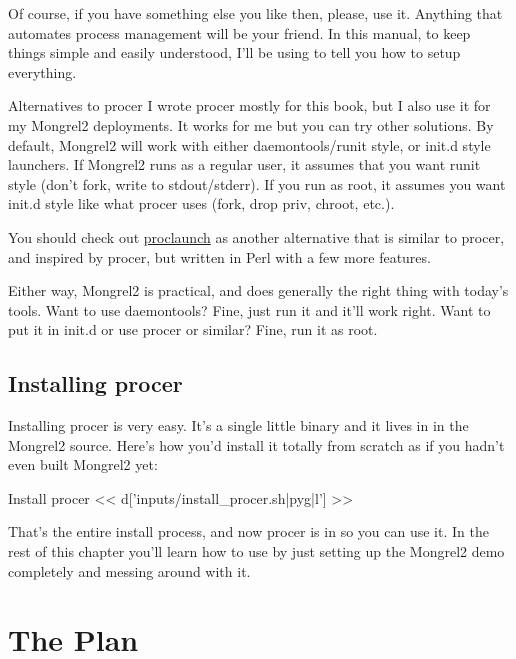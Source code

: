Of course, if you have something else you like then, please, use it.  Anything that automates
process management will be your friend.  In this manual, to keep things simple and easily
understood, I'll be using  to tell you how to setup everything.

\begin{aside}{Alternatives to procer}
I wrote procer mostly for this book, but I also use it for my Mongrel2 deployments.
It works for me but you can try other solutions.  By default, Mongrel2 will work with
either daemontools/runit style, or init.d style launchers.  If Mongrel2 runs as a
regular user, it assumes that you want runit style (don't fork, write to stdout/stderr).
If you run as root, it assumes you want init.d style like what procer uses (fork, drop priv, 
chroot, etc.).

You should check out \href{http://github.com/peterkeen/proclaunch}{proclaunch} as another
alternative that is similar to procer, and inspired by procer, but written in Perl with a
few more features.

Either way, Mongrel2 is practical, and does generally the right thing with today's tools.
Want to use daemontools?  Fine, just run it  and it'll
work right.  Want to put it in init.d or use procer or similar?  Fine, run it as root.
\end{aside}


\subsection{Installing procer}

Installing procer is very easy.  It's a single little binary and it lives in
 in the Mongrel2 source.  Here's how you'd install it
totally from scratch as if you hadn't even built Mongrel2 yet:

\begin{code}{Install procer}
<< d['inputs/install_procer.sh|pyg|l'] >>
\end{code}

That's the entire install process, and now procer is in 
so you can use it.  In the rest of this chapter you'll learn how to use 
by just setting up the Mongrel2 demo completely and messing around with it.



\section{The Plan}

